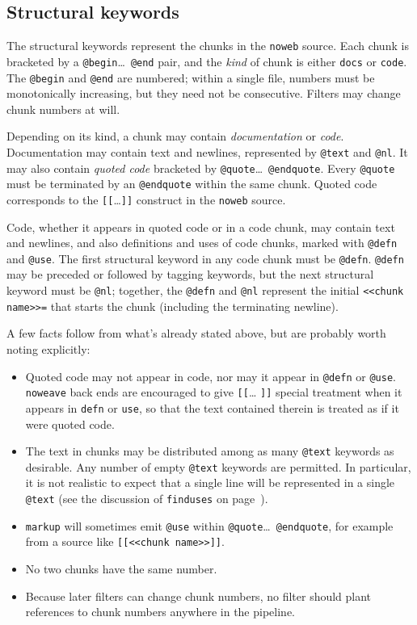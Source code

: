 \documentclass{article}
\makeatletter
\newcommand\kw[1]{\texttt{@#1}}
\newcommand\kws[2]{\kw{#1}\hbox{\thinspace}\ldots~\kw{#2}}
\makeatother
\begin{document}
\subsection{Structural keywords}

The structural  keywords represent the chunks in the {\tt noweb} source.
Each chunk is bracketed by a \kws{begin}{end} pair,
and the {\it kind} of chunk is either {\tt docs} or {\tt code}.
The \kw{begin} and \kw{end} are numbered; within a single file,
numbers must be monotonically increasing, but they need not be
consecutive.
Filters may change chunk numbers at will.

Depending on its kind, a chunk may contain {\em documentation} or {\em
code}. 
Documentation may contain text and newlines, represented by \kw{text}
and \kw{nl}.
It may also contain {\em quoted code} bracketed by
\kws{quote}{endquote}.
Every \kw{quote} must be terminated by an \kw{endquote} within the
same chunk.
Quoted code corresponds to the \verb+[[+\ldots \verb+]]+ construct in
the {\tt noweb} source.

Code, whether it appears in quoted code or in a code chunk,
may contain text and newlines, and also definitions and uses of
code chunks, marked with \kw{defn} and \kw{use}.
The first structural keyword in any code chunk must be \kw{defn}.
\kw{defn} may be preceded or followed by tagging keywords, but the
next structural keyword
must be \kw{nl}; 
together, the \kw{defn} and \kw{nl}
represent the initial \verb+<<chunk name>>=+
that starts the chunk (including the terminating newline).

A few facts follow from what's already stated above, but are probably
worth noting explicitly:
\begin{itemize}
\item 
Quoted code may not appear in code, nor may it appear in
\kw{defn} or \kw{use}.
{\tt noweave} back ends are encouraged to give \verb+[[+\ldots
\verb+]]+ special treatment when it appears in \verb+defn+ or
\verb+use+, so that the text contained therein is treated as if it
were quoted code.
\item
The text in chunks may be distributed among as many \kw{text}
keywords as desirable.  Any number of empty \kw{text} keywords are
permitted.  In particular, it is not realistic to expect that a single
line will be represented in a single \kw{text} (see the discussion of
{\tt finduses} on page~\pageref{finduses}).
\item
{\tt markup} will sometimes emit \kw{use} within
\kws{quote}{endquote}, for example from a source like \verb+[[<<chunk name>>]]+.
\item
No two chunks have the same number.
\item
Because later filters can change chunk numbers, no filter should
plant references to chunk numbers anywhere in the pipeline.
\end{itemize}
\end{document}
